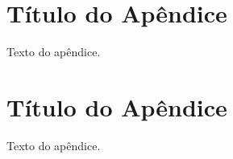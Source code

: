 \begin{apendicesenv}
    \partapendices

    \chapter{Título do Apêndice}
    Texto do apêndice.
    
    \chapter{Título do Apêndice}
    Texto do apêndice.

\end{apendicesenv}